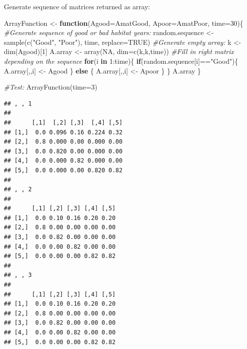 \documentclass[
]{book}
\newenvironment{Shaded}{\begin{snugshade}}{\end{snugshade}}
\newcommand{\AttributeTok}[1]{\textcolor[rgb]{0.77,0.63,0.00}{#1}}
\newcommand{\CommentTok}[1]{\textcolor[rgb]{0.56,0.35,0.01}{\textit{#1}}}
\newcommand{\ConstantTok}[1]{\textcolor[rgb]{0.00,0.00,0.00}{#1}}
\newcommand{\ControlFlowTok}[1]{\textcolor[rgb]{0.13,0.29,0.53}{\textbf{#1}}}
\newcommand{\DecValTok}[1]{\textcolor[rgb]{0.00,0.00,0.81}{#1}}
\newcommand{\FunctionTok}[1]{\textcolor[rgb]{0.00,0.00,0.00}{#1}}
\newcommand{\NormalTok}[1]{#1}
\newcommand{\OtherTok}[1]{\textcolor[rgb]{0.56,0.35,0.01}{#1}}
\newcommand{\SpecialCharTok}[1]{\textcolor[rgb]{0.00,0.00,0.00}{#1}}
\newcommand{\StringTok}[1]{\textcolor[rgb]{0.31,0.60,0.02}{#1}}
\begin{document}
Generate sequence of matrices returned as array:

\begin{Shaded}
\begin{Highlighting}[]
\NormalTok{ArrayFunction }\OtherTok{\textless{}{-}} \ControlFlowTok{function}\NormalTok{(}\AttributeTok{Agood=}\NormalTok{AmatGood, }
                          \AttributeTok{Apoor=}\NormalTok{AmatPoor, }
                          \AttributeTok{time=}\DecValTok{30}\NormalTok{)\{}
  \CommentTok{\#Generate sequence of good or bad habitat years:}
\NormalTok{  random.sequence }\OtherTok{\textless{}{-}} \FunctionTok{sample}\NormalTok{(}\FunctionTok{c}\NormalTok{(}\StringTok{"Good"}\NormalTok{, }\StringTok{"Poor"}\NormalTok{), }
\NormalTok{                            time, }
                            \AttributeTok{replace=}\ConstantTok{TRUE}\NormalTok{)}
  \CommentTok{\#Generate empty array:}
\NormalTok{  k }\OtherTok{\textless{}{-}} \FunctionTok{dim}\NormalTok{(Agood)[}\DecValTok{1}\NormalTok{]}
\NormalTok{  A.array }\OtherTok{\textless{}{-}} \FunctionTok{array}\NormalTok{(}\ConstantTok{NA}\NormalTok{, }\AttributeTok{dim=}\FunctionTok{c}\NormalTok{(k,k,time))}
  \CommentTok{\#Fill in right matrix depending on the sequence}
  \ControlFlowTok{for}\NormalTok{(i }\ControlFlowTok{in} \DecValTok{1}\SpecialCharTok{:}\NormalTok{time)\{}
    \ControlFlowTok{if}\NormalTok{(random.sequence[i]}\SpecialCharTok{==}\StringTok{"Good"}\NormalTok{)\{}
\NormalTok{      A.array[,,i] }\OtherTok{\textless{}{-}}\NormalTok{ Agood}
\NormalTok{    \}}
    \ControlFlowTok{else}\NormalTok{ \{}
\NormalTok{       A.array[,,i] }\OtherTok{\textless{}{-}}\NormalTok{ Apoor}
\NormalTok{    \}}
\NormalTok{  \}}
\NormalTok{  A.array}
\NormalTok{\}}

\CommentTok{\#Test:}
\FunctionTok{ArrayFunction}\NormalTok{(}\AttributeTok{time=}\DecValTok{3}\NormalTok{)}
\end{Highlighting}
\end{Shaded}

\begin{verbatim}
## , , 1
## 
##      [,1]  [,2] [,3]  [,4] [,5]
## [1,]  0.0 0.096 0.16 0.224 0.32
## [2,]  0.8 0.000 0.00 0.000 0.00
## [3,]  0.0 0.820 0.00 0.000 0.00
## [4,]  0.0 0.000 0.82 0.000 0.00
## [5,]  0.0 0.000 0.00 0.820 0.82
## 
## , , 2
## 
##      [,1] [,2] [,3] [,4] [,5]
## [1,]  0.0 0.10 0.16 0.20 0.20
## [2,]  0.8 0.00 0.00 0.00 0.00
## [3,]  0.0 0.82 0.00 0.00 0.00
## [4,]  0.0 0.00 0.82 0.00 0.00
## [5,]  0.0 0.00 0.00 0.82 0.82
## 
## , , 3
## 
##      [,1] [,2] [,3] [,4] [,5]
## [1,]  0.0 0.10 0.16 0.20 0.20
## [2,]  0.8 0.00 0.00 0.00 0.00
## [3,]  0.0 0.82 0.00 0.00 0.00
## [4,]  0.0 0.00 0.82 0.00 0.00
## [5,]  0.0 0.00 0.00 0.82 0.82
\end{verbatim}
\end{document}
